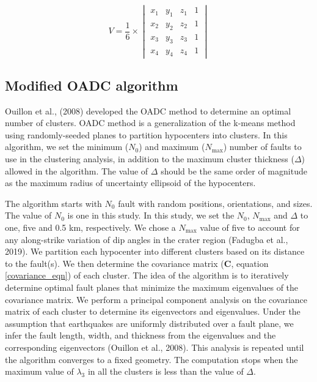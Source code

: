 \documentclass[draft]{agujournal2018}
\begin{document}
\begin{equation}\label{vol_eqn}
V = \frac{1}{6} \times 
\begin{vmatrix} 
x_{1} &  y_{1} & z_{1} & 1\\ 
x_{2} &  y_{2} & z_{2} & 1\\ 
x_{3} &  y_{3} & z_{3} & 1\\
x_{4} &  y_{4} & z_{4} & 1
\end{vmatrix} 
\end{equation}


 
\subsection{Modified OADC algorithm}
Ouillon et al., (2008) developed the OADC method to determine an optimal number of clusters. OADC method is a generalization of the k-means method using randomly-seeded planes to partition hypocenters into clusters. In this algorithm, we set the minimum ($N_0$) and maximum ($N_{\max}$) number of faults to use in the clustering analysis, in addition to the maximum cluster thickness ($\Delta$) allowed in the algorithm. The value of $\Delta$ should be the same order of magnitude as the maximum radius of uncertainty ellipsoid of the hypocenters. 

The algorithm starts with $N_0$ fault with random positions, orientations, and sizes. The value of $N_0$ is one in this study. In this study, we set the $N_0$, $N_{\max}$ and $\Delta$ to one, five and 0.5 km, respectively. We chose a $N_{\max}$ value of five to account for any along-strike variation of dip angles in the crater region (Fadugba et al., 2019). We partition each hypocenter into different clusters based on its distance to the fault(s). We then determine the covariance matrix (\textbf{C}, equation \ref{covariance_eqn}) of each cluster. The idea of the algorithm is to iteratively determine optimal fault planes that minimize the maximum eigenvalues of the covariance matrix. We perform a principal component analysis on the covariance matrix of each cluster to determine its eigenvectors and eigenvalues. Under the assumption that earthquakes are uniformly distributed over a fault plane, we infer the fault length, width, and thickness from the eigenvalues and the corresponding eigenvectors (Ouillon et al., 2008). This analysis is repeated until the algorithm converges to a fixed geometry. The computation stops when the maximum value of $\lambda_{3}$ in all the clusters is less than the value of $\Delta$. 
\end{document}
